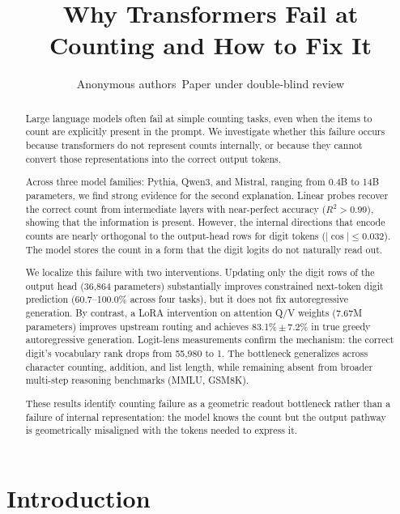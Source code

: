 \documentclass{article}
\title{Why Transformers Fail at Counting and How to Fix It}
\author{Anonymous authors\
Paper under double-blind review}
\begin{document}
\maketitle

\begin{abstract}
Large language models often fail at simple counting tasks, even when the items
to count are explicitly present in the prompt. We investigate whether this
failure occurs because transformers do not represent counts internally, or
because they cannot convert those representations into the correct output tokens.

Across three model families: Pythia, Qwen3, and Mistral, ranging from 0.4B to
14B parameters, we find strong evidence for the second explanation. Linear
probes recover the correct count from intermediate layers with near-perfect
accuracy ($R^2>0.99$), showing that the information is present. However, the
internal directions that encode counts are nearly orthogonal to the output-head
rows for digit tokens ($|\cos| \leq 0.032$). The model stores the count in a
form that the digit logits do not naturally read out.

We localize this failure with two interventions. Updating only the digit rows
of the output head (36,864 parameters) substantially improves constrained
next-token digit prediction (60.7--100.0\% across four tasks), but it does not
fix autoregressive generation. By contrast, a LoRA intervention on attention
Q/V weights (7.67M parameters) improves upstream routing and achieves
83.1\%\,$\pm$\,7.2\% in true greedy autoregressive generation. Logit-lens
measurements confirm the mechanism: the correct digit's vocabulary rank drops
from 55,980 to 1. The bottleneck generalizes
across character counting, addition, and list length, while remaining absent
from broader multi-step reasoning benchmarks (MMLU, GSM8K).

These results identify counting failure as a geometric readout bottleneck rather
than a failure of internal representation: the model knows the count but the
output pathway is geometrically misaligned with the tokens needed to express it.
\end{abstract}

\section{Introduction}
\label{sec:introduction}
\end{document}
